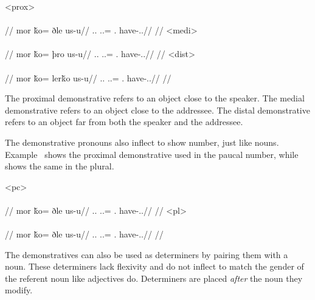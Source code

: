 	\a<prox>\begingl
		\glpreamble{}\\
		\\
		//
		\gla mor ǩo= ðle us-u//
		\glb \Fps.\An.\Abs{} \In.\Sg.\Dat= \Dem.\Prox{} have-\Ind.\Npst.\Ipfv//
		\glft{}//
	\endgl
	\a<medi>\begingl
		\glpreamble{}\\
		\\
		//
		\gla mor ǩo= þro us-u//
		\glb \Fps.\An.\Abs{} \In.\Sg.\Dat= \Dem.\Med{} have-\Ind.\Npst.\Ipfv//
		\glft{}//
	\endgl
	\a<dist>\begingl
		\glpreamble{}\\
		\\
		//
		\gla mor ǩo= lerǩo us-u//
		\glb \Fps.\An.\Abs{} \In.\Sg.\Dat= \Dem.\Dist{} have-\Ind.\Npst.\Ipfv//
		\glft{}//
	\endgl
\xe

The proximal demonstrative   refers to an object close to the speaker. The medial demonstrative   refers to an object close to the addressee. The distal demonstrative   refers to an object far from both the speaker and the addressee.

The demonstrative pronouns also inflect to show number, just like nouns. Example~ shows the proximal demonstrative   used in the paucal number, while  shows the same in the plural.

	\a<pc>\begingl
		\glpreamble{}\\
		\\
		//
		\gla mor ǩo= ðle us-u//
		\glb \Fps.\An.\Abs{} \In.\Pc.\Dat= \Dem.\Prox{} have-\Ind.\Npst.\Ipfv//
		\glft{}//
	\endgl
	\a<pl>\begingl
		\glpreamble{}\\
		\\
		//
		\gla mor ǩo= ðle us-u//
		\glb \Fps.\An.\Abs{} \In.\Pl.\Dat= \Dem.\Prox{} have-\Ind.\Npst.\Ipfv//
		\glft{}//
	\endgl
\xe

The demonstratives can also be used as determiners by pairing them with a noun. These determiners lack flexivity and do not inflect to match the gender of the referent noun like adjectives do. Determiners are placed \emph{after} the noun they modify.

